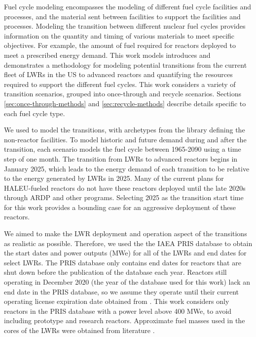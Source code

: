 Fuel cycle modeling encompasses the modeling of different 
fuel cycle facilities and processes, and the material 
sent between facilities to support the facilities and processes. 
Modeling the transition between different nuclear fuel cycles provides 
information on the quantity and timing of various materials to meet 
specific objectives. For example, the 
amount of fuel required for reactors deployed to meet a 
prescribed energy demand. 
This work models introduces and demonstrates a methodology 
for modeling potential transitions from the 
current fleet of \glspl{LWR} in the US to advanced reactors and 
quantifying the 
resources required to support the different fuel cycles. 
This work considers a variety of transition scenarios, grouped 
into once-through and recycle scenarios. Sections \ref{sec:once-through-methods}
and \ref{sec:recycle-methods} describe details specific to each 
fuel cycle type.

We used \Cyclus \cite{huff_fundamental_2016} to model the transitions, 
with archetypes from the \Cycamore library \cite{carlsen_cycamore_2014}
defining the non-reactor facilities. To model 
historic and future demand during and after the transition,
each scenario models the fuel 
cycle between 1965-2090 using a time step of one month. 
The transition from \glspl{LWR} 
to advanced reactors begins in January 2025, which leads to 
the energy demand of each transition to be relative to the energy generated by 
\glspl{LWR} in 2025.  Many of the 
current plans for \gls{HALEU}-fueled reactors do not have these reactors 
deployed until the late 2020s \cite{nichol_current_2021} through \gls{ARDP} 
and other programs. Selecting 2025 as the transition 
start time for this work provides a bounding case for 
an aggressive deployment of these reactors. 

We aimed to make the \gls{LWR} deployment and operation 
aspect of the transitions as realistic as possible. Therefore, 
we used the the \gls{IAEA} \gls{PRIS} 
database \cite{noauthor_power_1989} to obtain the start dates and 
power outputs (MWe) for all of the \glspl{LWR} and end 
dates for select \glspl{LWR}. The \gls{PRIS} database only contains end dates 
for reactors that are shut down before the publication of the 
database each year. Reactors still operating in December 2020  
(the year of the database used for this work) lack an end date 
in the \gls{PRIS} database, so we assume they operate until 
their current operating license expiration date obtained from  
\cite{nuclear_energy_institute_us_2021}. This work considers only 
reactors in the \gls{PRIS} database with a power level above 400 MWe, 
to avoid including prototype and research reactors. 
Approximate fuel masses used in the cores of the \glspl{LWR} were obtained 
from literature \cite{todreas_nuclear_2012,cacuci_handbook_2010}. 

